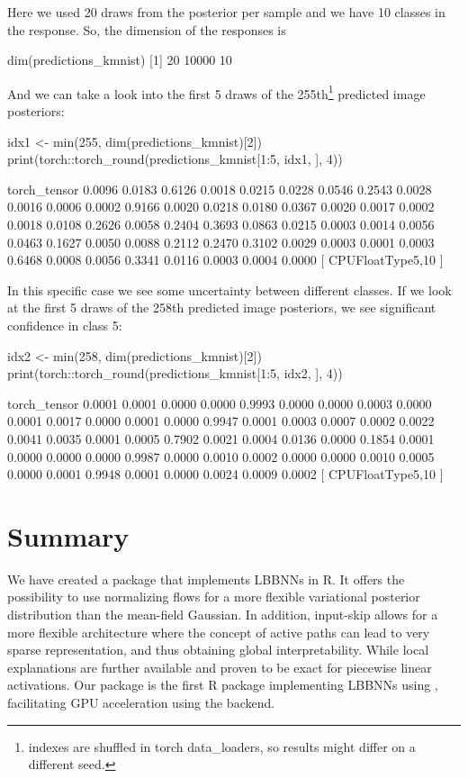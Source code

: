 Here we used 20 draws from the posterior per sample and we have 10 classes in the response. So, the dimension of the responses is 
\begin{example}
dim(predictions_kmnist)
[1]    20 10000    10
\end{example}
And we can take a look into the first 5 draws of the 255th\footnote{indexes are shuffled in torch data\_loaders, so results might differ on a different seed.} predicted image posteriors:
\begin{example}
idx1 <- min(255, dim(predictions_kmnist)[2])
print(torch::torch_round(predictions_kmnist[1:5, idx1, ], 4))

torch_tensor
 0.0096  0.0183  0.6126  0.0018  0.0215  0.0228  0.0546  0.2543  0.0028  0.0016
 0.0006  0.0002  0.9166  0.0020  0.0218  0.0180  0.0367  0.0020  0.0017  0.0002
 0.0018  0.0108  0.2626  0.0058  0.2404  0.3693  0.0863  0.0215  0.0003  0.0014
 0.0056  0.0463  0.1627  0.0050  0.0088  0.2112  0.2470  0.3102  0.0029  0.0003
 0.0001  0.0003  0.6468  0.0008  0.0056  0.3341  0.0116  0.0003  0.0004  0.0000
[ CPUFloatType{5,10} ]
\end{example}

In this specific case we see some uncertainty between different classes. If we look at the first 5 draws of the 258th predicted image posteriors, we see significant confidence in class 5:

\begin{example}
idx2 <- min(258, dim(predictions_kmnist)[2])
print(torch::torch_round(predictions_kmnist[1:5, idx2, ], 4))

torch_tensor
 0.0001  0.0001  0.0000  0.0000  0.9993  0.0000  0.0000  0.0003  0.0000  0.0001
 0.0017  0.0000  0.0001  0.0000  0.9947  0.0001  0.0003  0.0007  0.0002  0.0022
 0.0041  0.0035  0.0001  0.0005  0.7902  0.0021  0.0004  0.0136  0.0000  0.1854
 0.0001  0.0000  0.0000  0.0000  0.9987  0.0000  0.0010  0.0002  0.0000  0.0000
 0.0010  0.0005  0.0000  0.0001  0.9948  0.0001  0.0000  0.0024  0.0009  0.0002
[ CPUFloatType{5,10} ]
\end{example}

\section{Summary}
We have created a package that implements LBBNNs in R. It offers the possibility to use normalizing flows for a more flexible variational posterior distribution than the mean-field Gaussian. In addition, input-skip allows for a more flexible architecture where the concept of active paths can lead to very sparse representation, and thus obtaining global interpretability. While local explanations are further available and proven to be exact for piecewise linear activations. Our package is the first R package implementing LBBNNs using , facilitating GPU acceleration using the  backend. 

